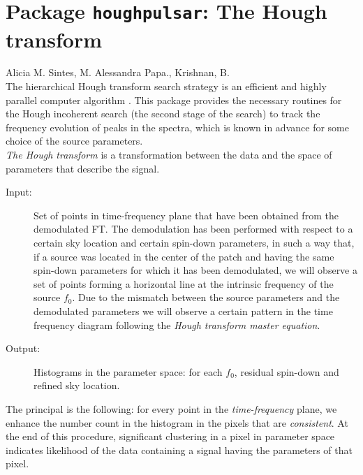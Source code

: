 %  
%
%
%

\chapter{Package \texttt{houghpulsar}: The Hough transform}


Alicia M. Sintes, M. Alessandra Papa., Krishnan, B.\\

The  hierarchical Hough transform search strategy is 
an efficient and highly parallel computer algorithm 
\cite{Schutz:1998} \cite{Papa:2001}.
This package provides the necessary routines for the Hough incoherent search
(the second stage of the search) 
  to track the frequency evolution of peaks in the spectra, which
  is known in advance for some choice of the source parameters.\\


{\it The Hough transform} is  a transformation
between the data and the space of parameters that describe the signal.
\begin{description}
\item[ Input:] Set of points in time-frequency plane that have been obtained
from the demodulated FT.
The demodulation  has been performed with respect to a certain sky
location and certain spin-down parameters,
in such a way  that, if a source was located in
the center of the patch and having the same spin-down parameters 
for which it has been
demodulated, we will observe a set of points forming a horizontal 
line at the intrinsic frequency  of the source $f_0$.
 Due to the mismatch between the source  parameters
 and the demodulated parameters we will observe a certain pattern in the time
  frequency diagram following the 
   {\sl Hough transform master equation}.
\item[ Output:] Histograms in the parameter space:
  for each $f_0$, residual spin-down and refined sky location.
\end{description}
The principal is the following: for every point in the {\it  time-frequency}
 plane, we enhance the number count in the 
histogram in the pixels that are {\it consistent}. At the end of this procedure,
significant clustering
 in a pixel in parameter space indicates
 likelihood of the data containing a signal 
having the parameters
of that pixel.
\\

